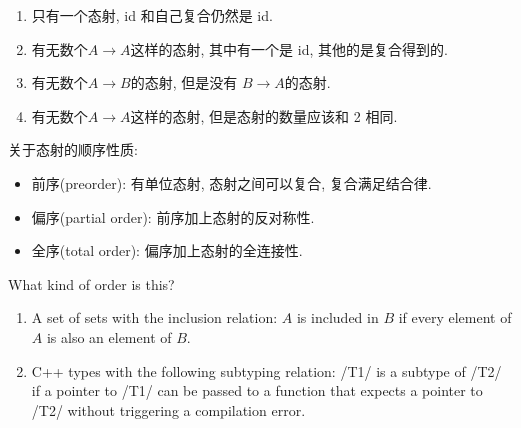 \documentclass[lang=cn]{elegantbook}
\begin{document}
\begin{solution}

\begin{enumerate}
    \item %

    只有一个态射, id 和自己复合仍然是 id.
    \item 
    
    有无数个$A\rightarrow A$这样的态射, 其中有一个是 id, 其他的是复合得到的.
    
    \item
    
    有无数个$A \rightarrow B$的态射, 但是没有 $B\rightarrow A$的态射.
    
    \item
    有无数个$A \rightarrow A$这样的态射, 但是态射的数量应该和 2 相同.

\end{enumerate}

\end{solution}

关于态射的顺序性质: \begin{itemize}
    \item 前序(preorder): 有单位态射, 态射之间可以复合, 复合满足结合律.
    \item 偏序(partial order): 前序加上态射的反对称性.
    \item 全序(total order): 偏序加上态射的全连接性.
\end{itemize}

\begin{exercise}
What kind of order is this?
\begin{enumerate}
    \item A set of sets with the inclusion relation: $A$ is included in $B$ if every element of $A$ is also an element of $B$.
    
    \item C++ types with the following subtyping relation: \cppinline/T1/ is a subtype of \cppinline/T2/ if a pointer to \cppinline/T1/ can be passed to a function that expects a pointer to \cppinline/T2/ without triggering a compilation error.
\end{enumerate}
\end{exercise}
\end{document}
